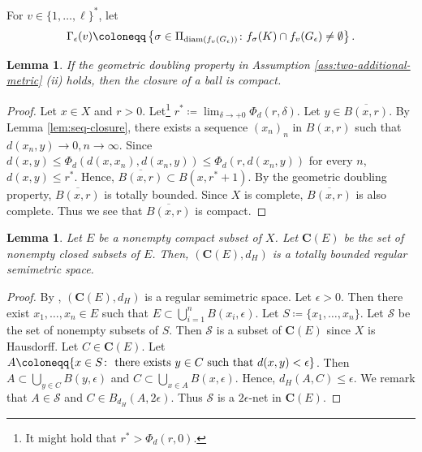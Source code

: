 \documentclass[a4paper, reqno, 11pt]{amsart}
\newtheorem{Lem}[Thm]{Lemma}
\theoremstyle{definition}
\begin{document}
For $v \in \{1,\dots, \ell\}^{*}$, let 
\[ \Gamma_{\epsilon}(v) \coloneqq \left\{\sigma \in \Pi_{\textup{diam}(f_{v} (G_{\epsilon}))} \colon f_{\sigma}(K) \cap f_{v} (G_{\epsilon}) \ne \emptyset \right\}.\]


\begin{Lem}\label{lem:doubling-closure-ball-cpt}
If  the geometric doubling property in Assumption \ref{ass:two-additional-metric} (ii) holds, 
then the closure of a ball is compact. 
\end{Lem}

\begin{proof}
Let $x \in X$ and $r > 0$. 
Let\footnote{It might hold that $r^* > \Phi_d (r,0)$.} $r^* \coloneqq \lim_{\delta \to +0} \Phi_d (r,\delta)$. 
Let $y \in \overline{B(x,r)}$. 
By Lemma \ref{lem:seq-closure}, there exists a sequence $(x_n)_n$ in $B(x,r)$ such that $d(x_n, y) \to 0, n \to \infty$.  
Since $d(x,y) \le \Phi_d (d(x, x_n), d(x_n, y)) \le \Phi_d (r, d(x_n, y))$ for every $n$, 
$d(x,y) \le r^*$. 
Hence, $ \overline{B(x,r)} \subset B(x, r^* + 1)$. 
By  the geometric doubling property, $\overline{B(x,r)}$ is totally bounded. 
Since $X$ is complete,  $\overline{B(x,r)}$ is also complete. 
Thus we see that  $\overline{B(x,r)}$ is compact. 
\end{proof}


\begin{Lem}\label{lem:set-of-closed-is-cpt-wrt-Haus-dist}
Let $E$ be a nonempty compact subset of $X$. 
Let $\mathbf{C}(E)$  be the set of nonempty closed subsets of $E$. 
Then, $(\mathbf{C}(E), d_H)$ is a totally bounded regular semimetric space. 
\end{Lem}

\begin{proof}
By \cite[Lemma 7]{BessenyeiPenzes2022}, 
$(\mathbf{C}(E), d_H)$ is a regular semimetric space. 
Let $\epsilon > 0$. 
Then there exist $x_1, \dots, x_n \in E$ such that $E \subset \bigcup_{i=1}^{n} B(x_i, \epsilon)$. 
Let $S \coloneqq \{x_1, \dots, x_n\}$. 
Let $\mathcal{S}$ be the set of nonempty subsets of $S$. 
Then $\mathcal{S}$ is a subset of $\mathbf{C}(E)$ since $X$ is Hausdorff. 
Let $C \in \mathbf{C}(E)$. 
Let $A \coloneqq \{x \in S \colon \textup{ there exists $y \in C$ such that $d(x,y) < \epsilon$} \}$. 
Then $A \subset \bigcup_{y \in C} B(y,\epsilon)$ and $C \subset \bigcup_{x \in A} B(x,\epsilon)$. 
Hence, $d_H (A, C) \le \epsilon$. 
We remark that $A \in \mathcal{S}$ and $C \in B_{d_H}(A, 2\epsilon)$. 
Thus $\mathcal{S}$ is a $2\epsilon$-net in $ \mathbf{C}(E)$. 
\end{proof}
\end{document}
